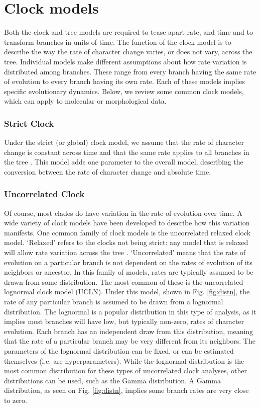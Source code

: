 \section{Clock models}
Both the clock and tree models are required to tease apart rate, and time and to transform branches in units of time.
The function of the clock model is to describe the way the rate of character change varies, or does not vary, across the tree.
Individual models make different assumptions about how rate variation is distributed among branches.
These range from  every branch having the same rate of evolution to every branch having its own rate.
Each of these models implies specific evolutionary dynamics.
Below, we review some common clock models, which can apply to molecular or morphological data.

\subsubsection{Strict Clock}
Under the strict (or global) clock model, we assume that the rate of character change is constant across time and that the same rate applies to all branches in the tree \citep{Zuckerkandl1962, Zuckerkandl1965EvolutionaryDivergenceConvergence}.
This model adds one parameter to the overall model, describing the conversion between the rate of character change  and absolute time.

\subsubsection{Uncorrelated Clock}
Of course, most clades do have variation in the rate of evolution over time. 
A wide variety of clock models have been developed to describe how this variation manifests.
One common family of clock models is the uncorrelated relaxed clock model.
`Relaxed' refers to the clocks not being strict: any model that is relaxed will allow rate variation across the tree \citep{Drummond2006, Drummond2007}.
`Uncorrelated' means that the rate of evolution on a particular branch is not dependent on the rates of evolution of its neighbors or ancestor.
In this family of models, rates are typically assumed to be drawn from some distribution.
The most common of these is the uncorrelated lognormal clock model (UCLN).
Under this model, shown in Fig. \ref{fig:distn}, the rate of any particular branch is assumed to be drawn from a lognormal distribution.
The lognormal is a popular distribution in this type of analysis, as it implies most branches will have low, but typically non-zero, rates of character evolution. 
Each branch has an independent draw from this distribution, meaning that the rate of a particular branch may be very different from its neighbors.
The parameters of the lognormal distribution can be fixed, or can be estimated themselves (i.e. are hyperparameters).
While the lognormal distribution is the most common distribution for these types of uncorrelated clock analyses, other distributions can be used, such as the Gamma distribution.
A Gamma distribution, as seen on Fig. \ref{fig:distn}, implies some branch rates are very close to zero.



